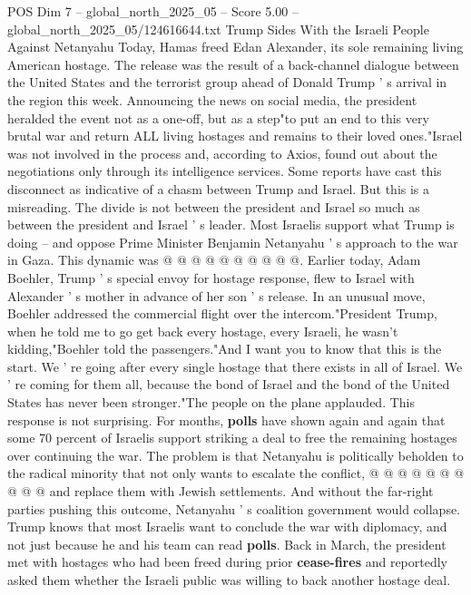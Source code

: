 \begin{textsample}{POS Dim 7 – global\_north\_2025\_05 – Score 5.00 – global\_north\_2025\_05/124616644.txt}  \label{ex:f7_pos_334}
Trump Sides With the Israeli People Against Netanyahu Today, Hamas freed Edan Alexander, its sole remaining living American hostage.
The release was the result of a back-channel dialogue between the United States and the terrorist group ahead of Donald Trump ' s arrival in the region this week.
Announcing the news on social media, the president heralded the event not as a one-off, but as a step"to put an end to this very brutal war and return ALL living hostages and remains to their loved ones."Israel was not involved in the process and, according to Axios, found out about the negotiations only through its intelligence services.
Some reports have cast this disconnect as indicative of a chasm between Trump and Israel.
But this is a misreading.
The divide is not between the president and Israel so much as between the president and Israel ' s leader.
Most Israelis support what Trump is doing -- and oppose Prime Minister Benjamin Netanyahu ' s approach to the war in Gaza.
This dynamic was @ @ @ @ @ @ @ @ @ @.
Earlier today, Adam Boehler, Trump ' s special envoy for hostage response, flew to Israel with Alexander ' s mother in advance of her son ' s release.
In an unusual move, Boehler addressed the commercial flight over the intercom."President Trump, when he told me to go get back every hostage, every Israeli, he wasn't kidding,"Boehler told the passengers."And I want you to know that this is the start.
We ' re going after every single hostage that there exists in all of Israel.
We ' re coming for them all, because the bond of Israel and the bond of the United States has never been stronger."The people on the plane applauded.
This response is not surprising.
For months, \textbf{polls} have shown again and again that some 70 percent of Israelis support striking a deal to free the remaining hostages over continuing the war.
The problem is that Netanyahu is politically beholden to the radical minority that not only wants to escalate the conflict, @ @ @ @ @ @ @ @ @ @ and replace them with Jewish settlements.
And without the far-right parties pushing this outcome, Netanyahu ' s coalition government would collapse.
Trump knows that most Israelis want to conclude the war with diplomacy, and not just because he and his team can read \textbf{polls}.
Back in March, the president met with hostages who had been freed during prior \textbf{cease-fires} and reportedly asked them whether the Israeli public was willing to back another hostage deal.

\end{textsample}
